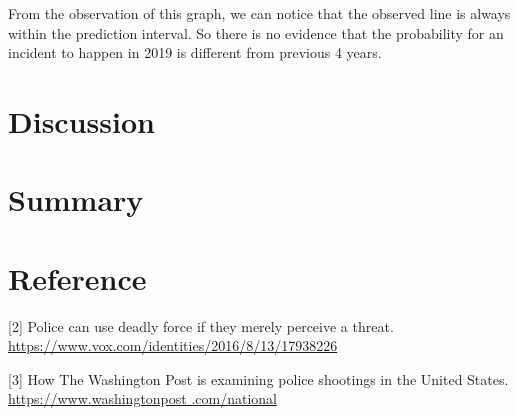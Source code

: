 \documentclass[11pt,a4paper,english]{article}
\begin{document}
From the observation of this graph, we can notice that the observed line is always within the prediction interval. So there is no evidence that the probability for an incident to happen in 2019 is different from previous 4 years.
\section{Discussion}
\section{Summary}
\section{Reference}
[2] Police can use deadly force if they merely perceive a threat. \href{https://www.vox.com/identities/2016/8/13/17938226/police-shootings-killings-law-legal-standard-garner-graham-connor}{https://www.vox.com/identities/2016/8/13/17938226}

[3] How The Washington Post is examining police shootings in the United States. \href{https://www.washingtonpost .com/national/how-the-washington-post-is-examining-police-shootings-in-the-united-states/2016/07/07/d9c52238-43ad-11e6-8856-f26de2537a9d_story.html?utm_term=.bb540299ce96}{https://www.washingtonpost .com/national}
\end{document}
